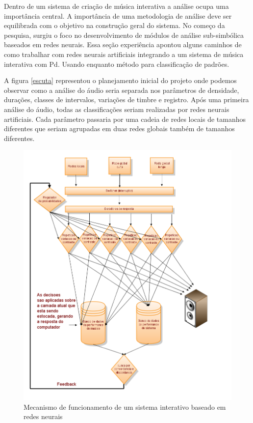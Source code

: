 \documentclass{ppgmus}
\begin{document}

Dentro de um sistema de criação de música interativa  a análise ocupa uma importância central. 
A importância de uma metodologia de análise deve ser equilibrada com o objetivo na construção geral do sistema.
No começo da pesquisa, surgiu o foco no desenvolvimento de módulos de análise sub-simbólica baseados em redes neurais.
Essa seção experiência apontou alguns caminhos de como trabalhar com redes neurais artificiais 
integrando a um sistema de música interativa com Pd. Usando enquanto método para classificação de
padrões.

A figura \ref{escuta} representou o planejamento inicial do projeto onde podemos observar como a 
análise do áudio seria separada nos parâmetros de
densidade, durações, classes de intervalos, variações de timbre e registro. Após uma primeira análise do
áudio, todas as classificações seriam realizadas por redes neurais artificiais. Cada parâmetro passaria
 por uma cadeia de redes locais de tamanhos diferentes que seriam agrupadas em duas 
redes globais também de tamanhos diferentes.

\begin{figure}
\includegraphics[scale=.5]{mecanismo}
\caption{Mecanismo de funcionamento de um sistema interativo baseado em redes neurais}
\label{mecanismo}
\end{figure}
\end{document}
